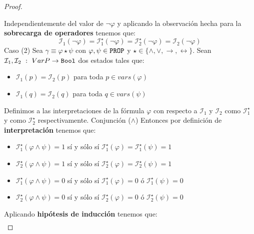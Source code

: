 \documentclass[a4paper]{article}
\begin{document}
\begin{proof}
\begin{itemize}
    \end{itemize}
    Independientemente del valor de \(\neg \varphi\) y aplicando la observación hecha para la \textbf{sobrecarga de operadores} tenemos que:
    \[
        \mathcal{I}_{1}\left(\neg \varphi\right) = \mathcal{I}^{\star}_{1}\left(\neg \varphi\right) = \mathcal{I}^{\star}_{2}\left(\neg \varphi\right) = \mathcal{I}_{2}\left(\neg \varphi\right)
    \]
    Caso (2)
    \newline
    Sea \(\gamma \equiv \varphi \star \psi \) con \(\varphi, \psi \in \text{\texttt{PROP}}\) y \(\star \in \{\land, \lor, \to, \leftrightarrow\}\). Sean $\mathcal{I}_1,\mathcal{I}_2 \ : \ VarP \to \text{\texttt{Bool}}$
    dos estados tales que:
    \begin{itemize}
        \item $\mathcal{I}_{1}(p)=\mathcal{I}_2(p)$ para toda $p\in vars(\varphi)$
        \item $\mathcal{I}_{1}(q)=\mathcal{I}_2(q)$ para toda $q\in vars(\psi)$
    \end{itemize}
    Definimos a las interpretaciones de la fórmula \(\varphi\) con respecto a \(\mathcal{I}_{1}\) y 
    \(\mathcal{I}_{2}\) como \(\mathcal{I}^{\star}_{1}\) y como \(\mathcal{I}^{\star}_{2}\) 
    respectivamente.
    \newline 
    Conjunción (\(\land\))
    \newline
    Entonces por definición de \textbf{interpretación} tenemos que:
    \begin{itemize}
        \item \(\mathcal{I}^{\star}_{1}\left(\varphi \land \psi\right) = 1\) sí y sólo sí \(\mathcal{I}^{\star}_{1}\left( \varphi\right) = \mathcal{I}^{\star}_{1}\left( \psi\right) = 1\)
        \item \(\mathcal{I}^{\star}_{2}\left(\varphi \land \psi\right) = 1\) sí y sólo sí \(\mathcal{I}^{\star}_{2}\left( \varphi\right) = \mathcal{I}^{\star}_{2}\left( \psi\right) = 1\)
        \item \(\mathcal{I}^{\star}_{1}\left(\varphi \land \psi\right) = 0\) sí y sólo sí \(\mathcal{I}^{\star}_{1}\left( \varphi\right) = 0\) ó \(\mathcal{I}^{\star}_{1}\left( \psi\right) = 0\)
        \item \(\mathcal{I}^{\star}_{2}\left(\varphi \land \psi\right) = 0\) sí y sólo sí \(\mathcal{I}^{\star}_{2}\left( \varphi\right) = 0\) ó \(\mathcal{I}^{\star}_{2}\left( \psi\right) = 0\)
    \end{itemize}
    Aplicando \textbf{hipótesis de inducción} tenemos que:
    \begin{align*}

\end{align*}
\end{proof}
\end{document}

